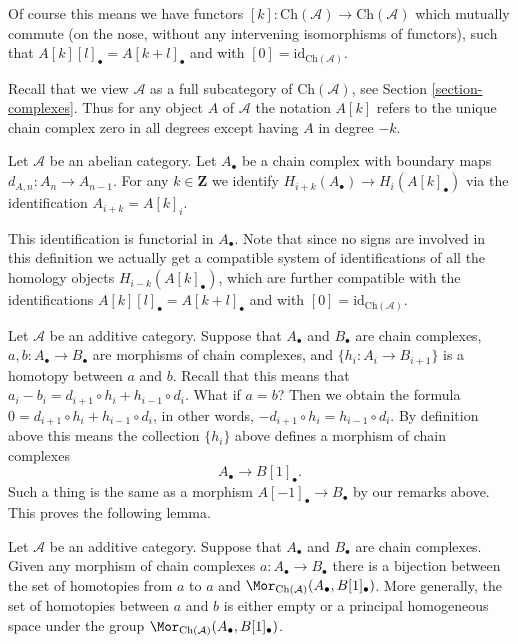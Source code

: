 \noindent
Of course this means we have functors
$[k] : \text{Ch}(\mathcal{A}) \to \text{Ch}(\mathcal{A})$
which mutually commute (on the nose, without
any intervening isomorphisms of functors),
such that $A[k][l]_\bullet = A[k + l]_\bullet$ and
with $[0] = \text{id}_{\text{Ch}(\mathcal{A})}$.

\medskip\noindent
Recall that we view $\mathcal{A}$ as a full subcategory of
$\text{Ch}(\mathcal{A})$, see Section \ref{section-complexes}.
Thus for any object $A$ of $\mathcal{A}$ the notation $A[k]$
refers to the unique chain complex zero in all degrees except having
$A$ in degree $-k$.

\begin{definition}
\label{definition-homology-shift}
Let $\mathcal{A}$ be an abelian category.
Let $A_\bullet$ be a chain complex
with boundary maps $d_{A, n} : A_n \to A_{n - 1}$.
For any $k \in \mathbf{Z}$ we identify
{\it $H_{i + k}(A_\bullet) \rightarrow H_i(A[k]_\bullet)$}
via the identification
$A_{i + k} = A[k]_i$.
\end{definition}

\noindent
This identification is functorial in $A_\bullet$.
Note that since no signs are involved in this
definition we actually get a compatible system
of identifications of all the homology
objects $H_{i - k}(A[k]_\bullet)$, which are
further compatible with the identifications
$A[k][l]_\bullet = A[k + l]_\bullet$ and
with $[0] = \text{id}_{\text{Ch}(\mathcal{A})}$.

\medskip\noindent
Let $\mathcal{A}$ be an additive category.
Suppose that $A_\bullet$ and $B_\bullet$ are
chain complexes, $a, b : A_\bullet \to B_\bullet$ are
morphisms of chain complexes, and $\{h_i : A_i \to B_{i + 1}\}$
is a homotopy between $a$ and $b$. Recall that this means
that
$a_i - b_i = d_{i + 1} \circ h_i + h_{i - 1} \circ d_i$.
What if $a = b$? Then we obtain the formula
$0 = d_{i + 1} \circ h_i + h_{i - 1} \circ d_i$,
in other words, $ - d_{i + 1} \circ h_i = h_{i - 1} \circ d_i$.
By definition above this means the collection $\{h_i\}$
above defines a morphism of chain complexes
$$
A_\bullet \longrightarrow B[1]_\bullet.
$$
Such a thing is the same as a morphism $A[-1]_\bullet \to B_\bullet$
by our remarks above. This proves the following lemma.

\begin{lemma}
\label{lemma-homotopy-shift}
Let $\mathcal{A}$ be an additive category.
Suppose that $A_\bullet$ and $B_\bullet$ are
chain complexes. Given any morphism of chain
complexes $a : A_\bullet \to B_\bullet$ there
is a bijection between the set of homotopies
from $a$ to $a$ and
$\Mor_{\text{Ch}(\mathcal{A})}(A_\bullet, B[1]_\bullet)$.
More generally, the set of homotopies between
$a$ and $b$ is either empty or a principal homogeneous
space under the group
$\Mor_{\text{Ch}(\mathcal{A})}(A_\bullet, B[1]_\bullet)$.
\end{lemma}

